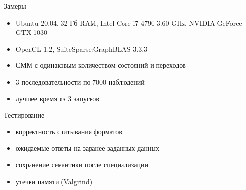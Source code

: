 \documentclass[hyperref={pdfpagelabels=false}]{beamer}
\begin{document}
\begin{frame}{}
\begin{block}{Замеры}
\begin{itemize}
	\item Ubuntu 20.04, 32 Гб RAM, Intel Core i7-4790 3.60 GHz, NVIDIA GeForce GTX 1030
	\item OpenCL 1.2, SuiteSparse:GraphBLAS 3.3.3
	\item СММ с одинаковым количеством состояний и переходов
	\item 3 последовательности по 7000 наблюдений
	\item лучшее время из 3 запусков
\end{itemize}
\end{block}
\vfill
\begin{block}{Тестирование}
\begin{itemize}
	\item корректность считывания форматов
	\item ожидаемые ответы на заранее заданных данных
	\item сохранение семантики после специализации
	\item утечки памяти (Valgrind)
\end{itemize}
\end{block}
\end{frame}
\end{document}
